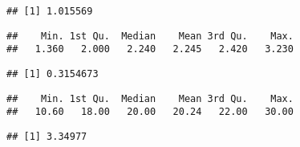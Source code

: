 \documentclass[
]{article}
\newenvironment{Shaded}{\begin{snugshade}}{\end{snugshade}}
\newcommand{\DataTypeTok}[1]{\textcolor[rgb]{0.13,0.29,0.53}{#1}}
\newcommand{\KeywordTok}[1]{\textcolor[rgb]{0.13,0.29,0.53}{\textbf{#1}}}
\newcommand{\NormalTok}[1]{#1}
\newcommand{\OperatorTok}[1]{\textcolor[rgb]{0.81,0.36,0.00}{\textbf{#1}}}
\newcommand{\StringTok}[1]{\textcolor[rgb]{0.31,0.60,0.02}{#1}}
\begin{document}
\begin{verbatim}
## [1] 1.015569
\end{verbatim}

\begin{Shaded}
\end{Shaded}

\begin{verbatim}
##    Min. 1st Qu.  Median    Mean 3rd Qu.    Max. 
##   1.360   2.000   2.240   2.245   2.420   3.230
\end{verbatim}

\begin{Shaded}
\end{Shaded}

\begin{verbatim}
## [1] 0.3154673
\end{verbatim}

\begin{Shaded}
\end{Shaded}

\begin{verbatim}
##    Min. 1st Qu.  Median    Mean 3rd Qu.    Max. 
##   10.60   18.00   20.00   20.24   22.00   30.00
\end{verbatim}

\begin{Shaded}
\end{Shaded}

\begin{verbatim}
## [1] 3.34977
\end{verbatim}

\begin{Shaded}
\end{Shaded}
\end{document}
